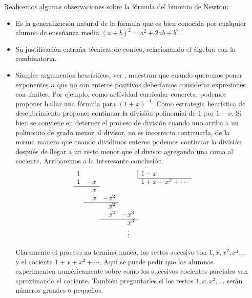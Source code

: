 \documentclass[a4paper,10pt,BCOR10mm,oneside,headsepline]{scrbook}
\begin{document}
Realicemos algunas observaciones sobre la fórmula del binomio de Newton:
\begin{itemize}
 \item Es la generalización natural de la fórmula que es  bien conocida por cualquier alumno de enseñanza media $(a+b)^2=a^2+2ab+b^2$.
 \item Su justificación entraña técnicas de conteo, relacionando el álgebra con la combinatoria.
 \item Simples argumentos heurísticos, ver  \cite{hairer_history}, muestran que cuando queremos poner exponentes $n$ que no son enteros positivos deberíamos considerar expresiones con límites. Por ejemplo, como actividad curricular concreta, podemos proponer hallar una fórmula para $(1+x)^{-1}$. Como estrategia heurística de descubrimiento proponer continuar la división polinomial de $1$ por $1-x$. Si bien se conviene en deterner el proceso de división cuando uno arriba a un polinomio de grado menor al divisor, no es incorrecto continuarla, de la misma manera que cuando dividimos enteros podemos continuar la división después de llegar a un resto menor que el divisor agregando una coma al cociente. Arribaremos a la interesante conclusión 
  \[
  \begin{array}{lllll} 
  1  &    &       &             & \multicolumn{1}{|l}{1-x}\\ \cline{5-5}
  1  & -x &       &             & 1 +x+x^2+\cdots  \\ \cline{1-2} 
     &  \phantom{-}x &       &             &        \\  
     & \phantom{-}x  & -x^2  &             &        \\ \cline{2-3}
     &               & \phantom{-}x^2      &        \\ 
     &               & \phantom{-}x^2      & -x^3   \\ \cline{3-4}
     &               &                     & \phantom{-} x^3 \\
     &                &                    &  \phantom{-}\vdots         \\
    \end{array}
\]
 
 Claramente el proceso no termina nunca, los restos sucesivo son $1,x,x^2,x³,\ldots$ y el cociente $1+x+x^2+\cdots$.  Aquí se puede pedir que los alumnos experimenten numéricamente sobre como los sucesivos cocientes parciales van aproximando el cociente. También preguntarles si los restos $1,x,x^2,\ldots$ serán números grandes o pequeños. 
 

\end{itemize}
\end{document}

